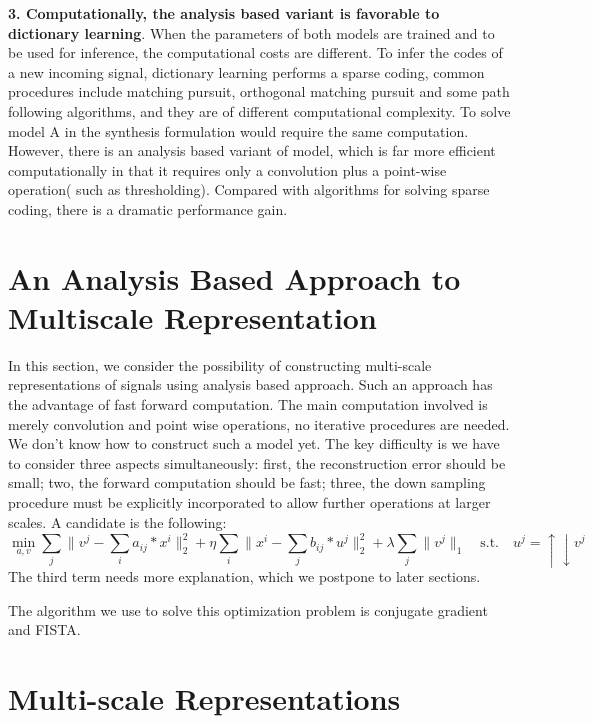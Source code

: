 \documentclass[a4paper]{article}
\begin{document}
\textbf{3. Computationally, the analysis based variant is favorable to dictionary learning}. When the parameters of both models are trained and to be used for inference, the computational costs are different. To infer the codes of a new incoming signal, dictionary learning performs a sparse coding, common procedures include matching pursuit, orthogonal matching pursuit and some path following algorithms, and they are of  different computational complexity. To solve model A in the synthesis formulation would require the same computation. However, there is an analysis based variant of model, which is far more efficient computationally in that it requires only a convolution plus a point-wise operation( such as thresholding). Compared with algorithms for solving sparse coding, there is a dramatic performance gain.
\newpage
{\color{cyan}
\section{An Analysis Based Approach to Multiscale Representation}
In this section, we consider the possibility of constructing multi-scale representations of signals using analysis based approach. Such an approach has the advantage of fast forward computation. The main computation involved is merely convolution and point wise operations, no iterative procedures are needed. We don't know how to construct such a model yet. The key difficulty is we have to consider three aspects simultaneously: first,  the reconstruction error should be small; two, the forward computation should be fast; three, the down sampling procedure must be explicitly incorporated to allow further operations at larger scales. A candidate is the following:
\begin{equation}
	\min_{a,v}{\sum_{j} \|v^j-\sum_{i} a_{ij}*x^i\|_2^2} + \eta \sum_{i} \|x^i-\sum_{j} b_{ij}*u^j\|_2^2+\lambda \sum_j\|v^j\|_1\quad \textrm{s.t.} \quad u^j=\uparrow\downarrow v^j
\end{equation}
The third term needs more explanation, which we postpone to later sections. 

The algorithm we use to solve this optimization problem is conjugate gradient and FISTA.
}

\newpage
\section{Multi-scale Representations}
\end{document}
